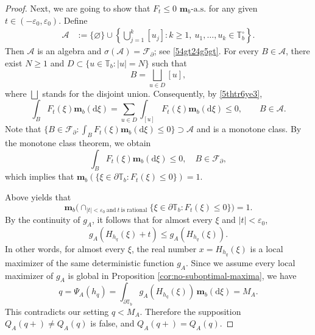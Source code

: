 \documentclass[a4paper, 11pt]{article}
\newcounter{assum}
\newcommand{\1}{\mathbf 1}
\theoremstyle{plain}
\begin{document}
\begin{proof}
Next, we are going to show that $F_t\leq0$ $\mathbf m_b\text{-a.s.}$ for any given $t\in(-\varepsilon_0,\varepsilon_0)$. Define
\begin{align*}
\mathcal A
&:=
\{\varnothing\}
\cup
\left\{
\bigcup_{j=1}^{k}[u_j]:
k\geq1,\
u_1,\ldots,u_k\in\mathbb T_b^\circ
\right\}.
\end{align*}
Then \(\mathcal A\) is an algebra and $\sigma(\mathcal A)=\mathcal F_{\partial}$; see \eqref{54gt24g5gt}. For every \(B\in\mathcal A\), there exist \(N\geq1\) and
\(D\subset\{u\in\mathbb T_b:|u|=N\}\) such that
\begin{equation*}
B=\bigsqcup_{u\in D}[u],
\end{equation*}
where $\bigsqcup$ stands for the disjoint union. Consequently, by \eqref{5thtr6ye3},
\begin{equation*}
\int_BF_t(\xi)\mathbf m_b(\mathrm{d}\xi)
=
\sum_{u\in D}\int_{[u]}F_t(\xi)\mathbf m_b(\mathrm{d}\xi)
\leq0,
\qquad B\in\mathcal A.
\end{equation*}
Note that $\{B\in\mathcal F_{\partial}:\int_BF_t(\xi)\mathbf m_b(\mathrm{d}\xi)
\leq0\}\supset\mathcal A$ and is a monotone class. By the monotone class theorem, we obtain
\begin{equation*}
\int_BF_t(\xi)\mathbf m_b(\mathrm{d}\xi)
\leq0,
\quad B\in\mathcal F_{\partial},
\end{equation*}
which implies that $\mathbf m_b(\{\xi\in \partial\mathbb T_b:F_t(\xi)\leq 0\})=1.$
\par
Above yields that
$$\mathbf m_b\Big(\cap_{|t|<\varepsilon_0~\text{and}~t~\text{is~rational} }\{\xi\in \partial\mathbb T_b:F_t(\xi)\leq 0\}\Big)=1.$$
By the
continuity of \(g_A\), it follows that for almost every \(\xi\) and $|t|<\varepsilon_0$,
\[
  g_A(H_{h_q}(\xi)+t)\leq g_A(H_{h_q}(\xi)).
\]
In other words, for almost every \(\xi\), the real number
\(x=H_{h_q}(\xi)\) is a local maximizer of the same deterministic function
\(g_A\). Since we assume every local maximizer of $g_A$ is global in Proposition \ref{cor:no-suboptimal-maxima}, we have
\[
  q=\Psi_A(h_q)
  =\int_{\partial\mathbb{T}_b}g_A(H_{h_q}(\xi))\,\mathbf m_b(\mathrm{d}\xi)
  =M_A.
\]
This contradicts our setting \(q<M_A\). Therefore the supposition
\(Q_A(q+)\neq Q_A(q)\) is false, and \(Q_A(q+)=Q_A(q)\).
\end{proof}
\end{document}
